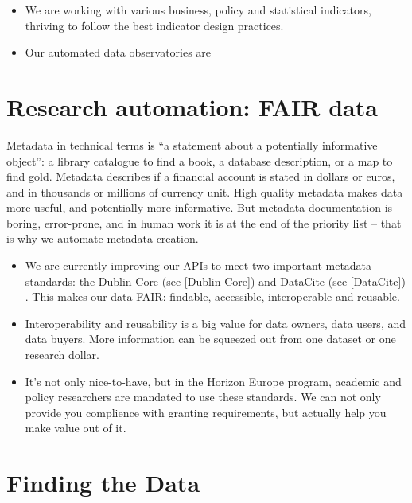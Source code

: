 \documentclass[
  a4paper,
  openany, a4paper, oneside]{book}
\providecommand{\tightlist}{%
  \setlength{\itemsep}{0pt}\setlength{\parskip}{0pt}}
\begin{document}
\begin{itemize}
\tightlist
\item
  We are working with various business, policy and statistical indicators, thriving to follow the best indicator design practices.
\item
  Our automated data observatories are
\end{itemize}

\hypertarget{research-automation-fair-data}{%
\section{Research automation: FAIR data}\label{research-automation-fair-data}}

Metadata in technical terms is ``a statement about a potentially informative object'': a library catalogue to find a book, a database description, or a map to find gold. Metadata describes if a financial account is stated in dollars or euros, and in thousands or millions of currency unit. High quality metadata makes data more useful, and potentially more informative. But metadata documentation is boring, error-prone, and in human work it is at the end of the priority list -- that is why we automate metadata creation.

\begin{itemize}
\tightlist
\item
  We are currently improving our APIs to meet two important metadata standards: the Dublin Core (see \ref{Dublin-Core}) and DataCite (see \ref{DataCite}) . This makes our data \href{https://www.go-fair.org/fair-principles/}{FAIR}: findable, accessible, interoperable and reusable.
\item
  Interoperability and reusability is a big value for data owners, data users, and data buyers. More information can be squeezed out from one dataset or one research dollar.
\item
  It's not only nice-to-have, but in the Horizon Europe program, academic and policy researchers are mandated to use these standards. We can not only provide you complience with granting requirements, but actually help you make value out of it.
\end{itemize}

\hypertarget{finding-the-data}{%
\section{Finding the Data}\label{finding-the-data}}
\end{document}
